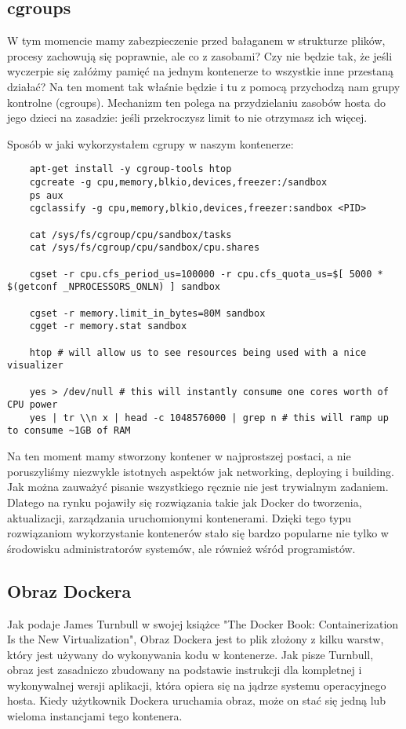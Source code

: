 \subsection{cgroups}
W tym momencie mamy zabezpieczenie przed bałaganem w strukturze plików, procesy zachowują się poprawnie, ale co z zasobami? Czy nie będzie tak, że jeśli wyczerpie się załóżmy pamięć na jednym kontenerze to wszystkie inne przestaną działać? Na ten moment tak właśnie będzie i tu z pomocą przychodzą nam grupy kontrolne (cgroups). Mechanizm ten polega na przydzielaniu zasobów hosta do jego dzieci na zasadzie: jeśli przekroczysz limit to nie otrzymasz ich więcej. 

Sposób w jaki wykorzystałem cgrupy w naszym kontenerze: 

\begin{lstlisting}
    apt-get install -y cgroup-tools htop
    cgcreate -g cpu,memory,blkio,devices,freezer:/sandbox
    ps aux 
    cgclassify -g cpu,memory,blkio,devices,freezer:sandbox <PID>

    cat /sys/fs/cgroup/cpu/sandbox/tasks
    cat /sys/fs/cgroup/cpu/sandbox/cpu.shares

    cgset -r cpu.cfs_period_us=100000 -r cpu.cfs_quota_us=$[ 5000 * $(getconf _NPROCESSORS_ONLN) ] sandbox

    cgset -r memory.limit_in_bytes=80M sandbox
    cgget -r memory.stat sandbox

    htop # will allow us to see resources being used with a nice visualizer

    yes > /dev/null # this will instantly consume one cores worth of CPU power
    yes | tr \\n x | head -c 1048576000 | grep n # this will ramp up to consume ~1GB of RAM
\end{lstlisting}
Na ten moment mamy stworzony kontener w najprostszej postaci, a nie poruszyliśmy niezwykle istotnych aspektów jak networking, deploying i building. 
Jak można zauważyć pisanie wszystkiego ręcznie nie jest trywialnym zadaniem. Dlatego na rynku pojawiły się rozwiązania takie jak Docker do tworzenia, aktualizacji, zarządzania uruchomionymi kontenerami. Dzięki tego typu rozwiązaniom wykorzystanie kontenerów stało się bardzo popularne nie tylko w środowisku administratorów systemów, ale również wśród programistów. 
\subsection{Obraz Dockera}
Jak podaje James Turnbull w swojej książce "The Docker Book: Containerization Is the New Virtualization", Obraz Dockera jest to plik złożony z kilku warstw, który jest używany do wykonywania kodu w kontenerze. Jak pisze Turnbull, obraz jest zasadniczo zbudowany na podstawie instrukcji dla kompletnej i wykonywalnej wersji aplikacji, która opiera się na jądrze systemu operacyjnego hosta. Kiedy użytkownik Dockera uruchamia obraz, może on stać się jedną lub wieloma instancjami tego kontenera.
